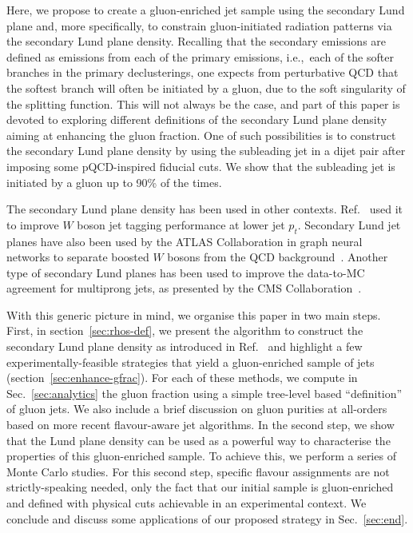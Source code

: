 \documentclass[a4paper,11pt]{article}
\begin{document}
Here, we propose to create a gluon-enriched jet sample using the secondary Lund plane and, more specifically, to constrain gluon-initiated radiation patterns via the secondary Lund plane density. Recalling that the secondary emissions are defined as emissions from each of the primary emissions, i.e.,\ each of the softer branches in the primary declusterings,  one expects from perturbative QCD that the softest branch will often be initiated by a gluon, due to the soft singularity of the splitting function. This will not always be the case, and part of this paper is devoted to exploring different definitions of the secondary Lund plane density aiming at enhancing the gluon fraction. One of such possibilities is to construct the secondary Lund plane density by using the subleading jet in a dijet pair after imposing some pQCD-inspired fiducial cuts. We show that the subleading jet is initiated by a gluon up to 90\% of the times.

The secondary Lund plane density has been used in other contexts. Ref.~\cite{Dreyer:2018nbf} used it to improve $W$ boson jet tagging performance at lower jet $p_t$. Secondary Lund jet planes have also been used by the ATLAS Collaboration in graph neural networks to separate boosted $W$ bosons from the QCD background~\cite{ATL-PHYS-PUB-2023-017}. Another type of secondary Lund planes has been used to improve the data-to-MC agreement for multiprong jets, as presented by the CMS Collaboration~\cite{CMS-DP-2023-046}.

With this generic picture in mind, we organise this paper in two main steps. 
%
First, in section~\ref{sec:rhos-def}, we present the algorithm to construct the secondary Lund plane density as introduced in Ref.~\cite{Dreyer:2018nbf} and highlight a few experimentally-feasible strategies that yield a gluon-enriched sample of jets (section~\ref{sec:enhance-gfrac}). For each of these methods, we compute in Sec.~\ref{sec:analytics} the gluon fraction using a simple tree-level based ``definition'' of gluon jets. We also include a brief discussion on gluon purities at all-orders based on more recent flavour-aware jet algorithms.
%
In the second step, we show that the Lund plane density can be used as a powerful way to characterise the properties of this gluon-enriched sample. To achieve this, we perform a series of Monte Carlo studies. For this second step, specific flavour assignments are not strictly-speaking needed, only the fact that our initial sample is gluon-enriched and defined with physical cuts achievable in an experimental context.
%
We conclude and discuss some applications of our proposed strategy in Sec.~\ref{sec:end}.    
\end{document}
